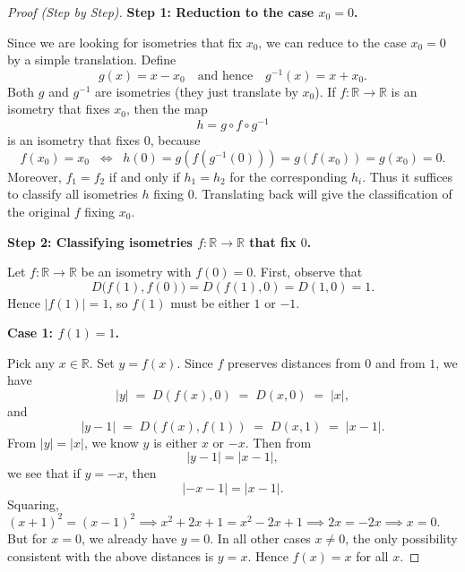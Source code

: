 \documentclass[12pt]{article}
\theoremstyle{definition} %
\theoremstyle{plain} %
\begin{document}
        \begin{proof}[Proof (Step by Step)]
        \textbf{Step 1: Reduction to the case $x_0=0$.}
        
        Since we are looking for isometries that fix $x_0$, we can reduce to the case $x_0=0$ by a simple translation.  
        Define 
        \[
        g(x) = x - x_0 
        \quad \text{and hence} \quad 
        g^{-1}(x) = x + x_0.
        \]
        Both $g$ and $g^{-1}$ are isometries (they just translate by $x_0$).  
        If $f : \mathbb{R} \to \mathbb{R}$ is an isometry that fixes $x_0$, then the map 
        \[
        h = g \circ f \circ g^{-1}
        \]
        is an isometry that fixes $0$, because 
        \[
        f(x_0) = x_0
        \;\;\Longleftrightarrow\;\;
        h(0) = g(f(g^{-1}(0))) = g(f(x_0)) = g(x_0) = 0.
        \]
        Moreover, $f_1 = f_2$ if and only if $h_1 = h_2$ for the corresponding $h_i$.  
        Thus it suffices to classify all isometries $h$ fixing $0$.  Translating back will give the classification of the original $f$ fixing $x_0$.
        
        \medskip
        
        \textbf{Step 2: Classifying isometries $f : \mathbb{R} \to \mathbb{R}$ that fix $0$.}
        
        Let $f : \mathbb{R} \to \mathbb{R}$ be an isometry with $f(0)=0$.  
        First, observe that
        \[
        D\bigl(f(1), f(0)\bigr) = D(f(1),0) = D(1,0) = 1.
        \]
        Hence $|f(1)| = 1$, so $f(1)$ must be either $1$ or $-1$.
        
        \medskip
        
        \textbf{Case 1: $f(1) = 1$.}
        
        Pick any $x \in \mathbb{R}$.  Set $y = f(x)$.  Since $f$ preserves distances from $0$ and from $1$, we have
        \[
        |y| \;=\; D(f(x), 0) \;=\; D(x,0) \;=\; |x|,
        \]
        and
        \[
        |y - 1| \;=\; D(f(x), f(1)) \;=\; D(x,1) \;=\; |x - 1|.
        \]
        From $|y| = |x|$, we know $y$ is either $x$ or $-x$.  Then from 
        \[
        |y - 1| = |x - 1|,
        \]
        we see that if $y = -x$, then 
        \[
        |-x - 1| = |x - 1|.
        \]
        Squaring, $(x+1)^2 = (x-1)^2 \implies x^2 + 2x + 1 = x^2 - 2x + 1 \implies 2x = -2x \implies x=0.$  
        But for $x=0$, we already have $y=0$.  In all other cases $x \neq 0$, the only possibility consistent with the above distances is $y=x$.  Hence $f(x)=x$ for all $x$.  
        

\end{proof}
\end{document}
